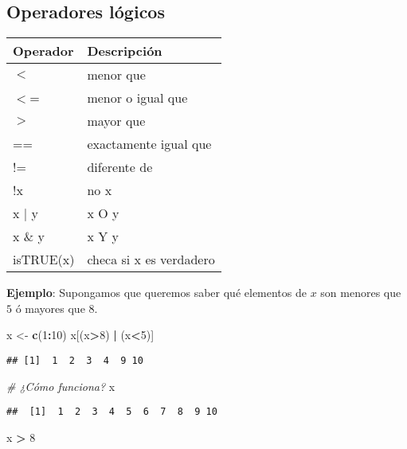 \documentclass[]{article}
\newenvironment{Shaded}{\begin{snugshade}}{\end{snugshade}}
\newcommand{\KeywordTok}[1]{\textcolor[rgb]{0.13,0.29,0.53}{\textbf{#1}}}
\newcommand{\DecValTok}[1]{\textcolor[rgb]{0.00,0.00,0.81}{#1}}
\newcommand{\StringTok}[1]{\textcolor[rgb]{0.31,0.60,0.02}{#1}}
\newcommand{\CommentTok}[1]{\textcolor[rgb]{0.56,0.35,0.01}{\textit{#1}}}
\newcommand{\OperatorTok}[1]{\textcolor[rgb]{0.81,0.36,0.00}{\textbf{#1}}}
\newcommand{\NormalTok}[1]{#1}
\begin{document}
\subsection{Operadores lógicos}\label{operadores-logicos}

\begin{table}[ht]
\centering
\begin{tabular}{ll}
  \hline
Operador & Descripción \\ 
  \hline
$<$ & menor que \\ 
  $<$= & menor o igual que \\ 
  $>$ & mayor que \\ 
  == & exactamente igual que \\ 
  != & diferente de \\ 
  !x &  no x \\ 
  x $|$ y & x O y \\ 
  x \& y & x Y y \\ 
  isTRUE(x) & checa si x es verdadero \\ 
   \hline
\end{tabular}
\end{table}

\textbf{Ejemplo}: Supongamos que queremos saber qué elementos de \(x\)
son menores que \(5\) ó mayores que \(8\).

\begin{Shaded}
\begin{Highlighting}[]
\NormalTok{x <-}\StringTok{ }\KeywordTok{c}\NormalTok{(}\DecValTok{1}\OperatorTok{:}\DecValTok{10}\NormalTok{)}
\NormalTok{x[(x}\OperatorTok{>}\DecValTok{8}\NormalTok{) }\OperatorTok{|}\StringTok{ }\NormalTok{(x}\OperatorTok{<}\DecValTok{5}\NormalTok{)]}
\end{Highlighting}
\end{Shaded}

\begin{verbatim}
## [1]  1  2  3  4  9 10
\end{verbatim}

\begin{Shaded}
\begin{Highlighting}[]
\CommentTok{# ¿Cómo funciona?}
\NormalTok{x}
\end{Highlighting}
\end{Shaded}

\begin{verbatim}
##  [1]  1  2  3  4  5  6  7  8  9 10
\end{verbatim}

\begin{Shaded}
\begin{Highlighting}[]
\NormalTok{x }\OperatorTok{>}\StringTok{ }\DecValTok{8}
\end{Highlighting}
\end{Shaded}
\end{document}
